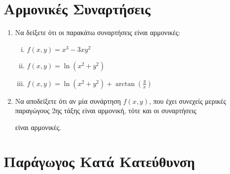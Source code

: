 


\pagestyle{askhseis}
\everymath{\displaystyle}





\begin{center}
  \minibox{\large\bfseries \textcolor{Col1}{Ασκήσεις στην Παράγωγο κατά Κατεύθυνση}}
\end{center}

\vspace{\baselineskip}

\section*{Αρμονικές Συναρτήσεις}

\begin{enumerate}

  \item Να δείξετε ότι οι παρακάτω συναρτήσεις είναι αρμονικές:
    \begin{enumerate}[(i)]
      \item $ f(x,y) = x^{3}-3xy^{2} $
      \item $ f(x,y) = \ln(x^{2} + y^{2}) $
      \item $ f(x,y) = \ln{(x^{2}+y^{2})} + \arctan(\frac{y}{x}) $
    \end{enumerate}

  \item Να αποδείξετε ότι αν μία συνάρτηση $f(x,y)$, που έχει συνεχείς 
    μερικές παραγώγους 2ης τάξης είναι αρμονική, τότε και οι συναρτήσεις 
    είναι αρμονικές.
\end{enumerate}

\section*{Παράγωγος Κατά Κατεύθυνση}

